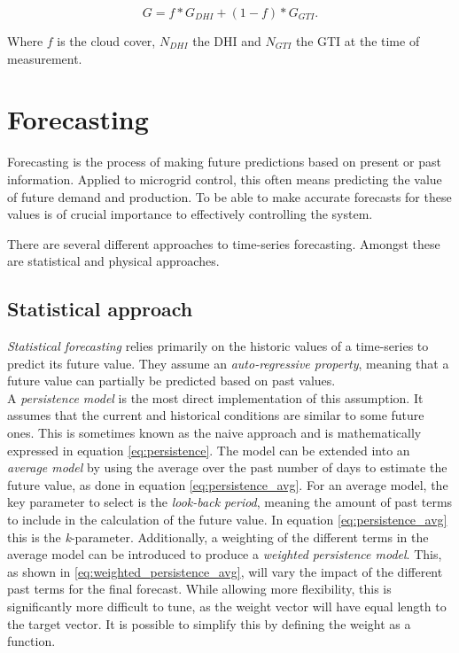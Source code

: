 \begin{equation}
    G = f*G_{DHI} + (1-f)*G_{GTI}
    \label{eq:irradiance}.
\end{equation}

Where $f$ is the cloud cover, $N_{DHI}$ the DHI and $N_{GTI}$ the GTI at the time of measurement. 

\section{Forecasting}
Forecasting is the process of making future predictions based on present or past information. Applied to microgrid control, this often means predicting the value of future demand and production. To be able to make accurate forecasts for these values is of crucial importance to effectively controlling the system. 

There are several different approaches to time-series forecasting. Amongst these are statistical and physical approaches. 

\subsection{Statistical approach}\label{seq:stat_forecasting}

\textit{Statistical forecasting} relies primarily on the historic values of a time-series to predict its future value. They assume an \textit{auto-regressive property}, meaning that a future value can partially be predicted based on past values.\\

A \textit{persistence model} is the most direct implementation of this assumption. It assumes that the current and historical conditions are similar  to some future ones. This is sometimes known as the naive approach and is mathematically expressed in equation \ref{eq:persistence}. The model can be  extended into an \textit{average model} by using the average over the past number of days to estimate the future value, as done in equation \ref{eq:persistence_avg}. For an average model, the key parameter to select is the \textit{look-back period}, meaning the amount of past terms to include in the calculation of the future value. In equation \ref{eq:persistence_avg} this is the \textit{k}-parameter. Additionally, a weighting of the different terms in the average model can be introduced to produce a \textit{weighted persistence model}. This, as shown in \ref{eq:weighted_persistence_avg}, will vary the impact of the different past terms for the final forecast. While allowing more flexibility, this is significantly more difficult to tune, as the weight vector will have equal length to the target vector. It is possible to simplify this by defining the weight as a function.    

